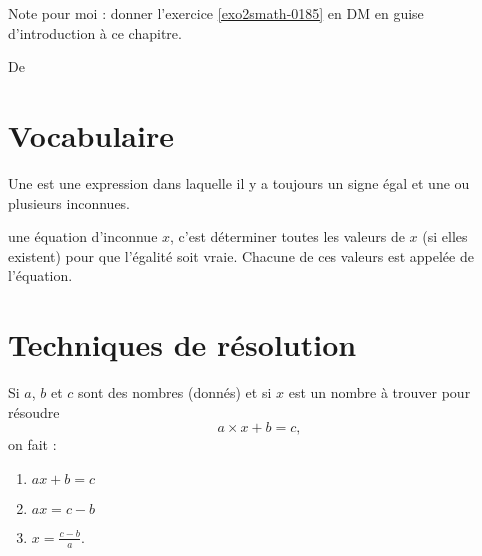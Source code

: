 
Note pour moi : donner l'exercice \ref{exo2smath-0185} en DM en guise d'introduction à ce chapitre.


De \cite{NRHooXFvgpp4}

\section{Vocabulaire}

\begin{definition}
    Une  est une expression dans laquelle il y a toujours un signe égal et une ou plusieurs inconnues.
\end{definition}

\begin{definition}
     une équation d'inconnue \( x\), c'est déterminer toutes les valeurs de \( x\) (si elles existent) pour que l'égalité soit vraie. Chacune de ces valeurs est appelée  de l'équation.
\end{definition}

\section{Techniques de résolution}

Si \( a\), \( b\) et \( c\) sont des nombres (donnés) et si \( x\) est un nombre à trouver pour résoudre
\begin{equation}
    a\times x+b=c,
\end{equation}
on fait :
\begin{enumerate}
    \item
        $ax+b=c$
    \item
        $ax=c-b$
    \item
        $x=\frac{ c-b }{ a }$.
\end{enumerate}

